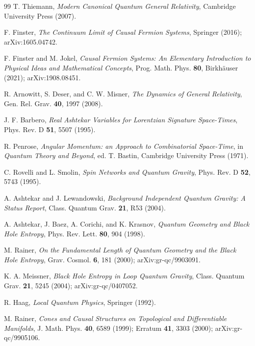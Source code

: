 \documentclass[11pt,a4paper]{article}
\theoremstyle{definition}
\begin{document}
\begin{thebibliography}{99}
		T. Thiemann, \emph{Modern Canonical Quantum General Relativity}, Cambridge University Press (2007).
		
		F. Finster, \emph{The Continuum Limit of Causal Fermion Systems}, Springer (2016); arXiv:1605.04742.
		
		F. Finster and M. Jokel, \emph{Causal Fermion Systems: An Elementary Introduction to Physical Ideas and Mathematical Concepts}, Prog. Math. Phys. \textbf{80}, Birkhäuser (2021); arXiv:1908.08451.
		
		R. Arnowitt, S. Deser, and C. W. Misner, \emph{The Dynamics of General Relativity}, Gen. Rel. Grav. \textbf{40}, 1997 (2008).
		
		J. F. Barbero, \emph{Real Ashtekar Variables for Lorentzian Signature Space-Times}, Phys. Rev. D \textbf{51}, 5507 (1995).
		
		R. Penrose, \emph{Angular Momentum: an Approach to Combinatorial Space-Time}, in \emph{Quantum Theory and Beyond}, ed. T. Bastin, Cambridge University Press (1971).
		
		C. Rovelli and L. Smolin, \emph{Spin Networks and Quantum Gravity}, Phys. Rev. D \textbf{52}, 5743 (1995).
		
		A. Ashtekar and J. Lewandowski, \emph{Background Independent Quantum Gravity: A Status Report}, Class. Quantum Grav. \textbf{21}, R53 (2004).
		
		A. Ashtekar, J. Baez, A. Corichi, and K. Krasnov, \emph{Quantum Geometry and Black Hole Entropy}, Phys. Rev. Lett. \textbf{80}, 904 (1998).
		
		M. Rainer, \emph{On the Fundamental Length of Quantum Geometry and the Black Hole Entropy}, Grav. Cosmol. \textbf{6}, 181 (2000); arXiv:gr-qc/9903091.
		
		K. A. Meissner, \emph{Black Hole Entropy in Loop Quantum Gravity}, Class. Quantum Grav. \textbf{21}, 5245 (2004); arXiv:gr-qc/0407052.
		
		R. Haag, \emph{Local Quantum Physics}, Springer (1992).
		
		M. Rainer, \emph{Cones and Causal Structures on Topological and Differentiable Manifolds}, J. Math. Phys. \textbf{40}, 6589 (1999); Erratum \textbf{41}, 3303 (2000); arXiv:gr-qc/9905106.
		

\end{thebibliography}
\end{document}
